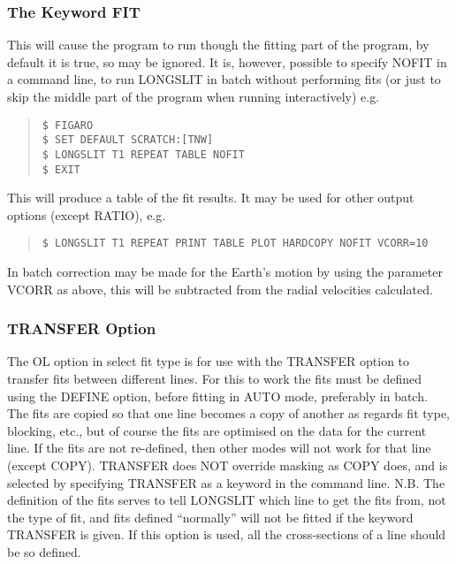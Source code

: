 \subsubsection{The Keyword FIT}
\label{long.fit}

This will cause the program to run though the fitting part of the
program, by default it is true, so may be ignored. It is, however,
possible to specify NOFIT in a command line, to run LONGSLIT in batch
without performing fits (or just to skip the middle part of the program
when running interactively) e.g.\ 
\begin{quote}\begin{verbatim}
$ FIGARO
$ SET DEFAULT SCRATCH:[TNW]
$ LONGSLIT T1 REPEAT TABLE NOFIT
$ EXIT
\end{verbatim}\end{quote}
This will produce a table of the fit results.
It may be used for other output options (except RATIO), e.g.\ 
\begin{quote}\begin{verbatim}
$ LONGSLIT T1 REPEAT PRINT TABLE PLOT HARDCOPY NOFIT VCORR=10
\end{verbatim}\end{quote}

  In batch correction may be made for the Earth's motion by using the
parameter VCORR as above, this will be subtracted from the radial
velocities calculated.

\subsubsection{TRANSFER Option}

The OL option in select fit type is for use with the TRANSFER option to
transfer fits between different lines. For this to work the fits must
be defined using the DEFINE option, before fitting in AUTO mode,
preferably in batch. The fits are copied so that one line becomes a
copy of another as regards fit type, blocking, etc., but of course the
fits are optimised on the data for the current line. If the fits are
not re-defined, then other modes will not work for that line (except
COPY). TRANSFER does NOT override masking as COPY does, and is selected
by specifying TRANSFER as a keyword in the command line. N.B. The
definition of the fits serves to tell LONGSLIT which line to get the
fits from, not the type of fit, and fits defined ``normally'' will not
be fitted if the keyword TRANSFER is given.
If this option is used, all the cross-sections of a line should be so
defined.

